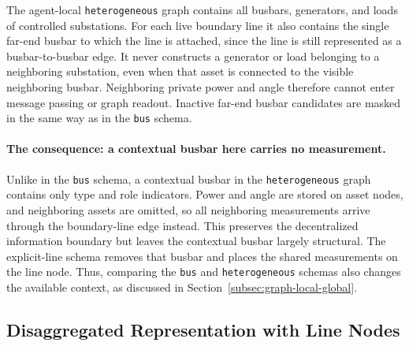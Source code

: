 The agent-local \texttt{heterogeneous} graph contains all busbars, generators,
and loads of controlled substations. For each live boundary line it also
contains the single far-end busbar to which the line is attached, since the
line is still represented as a busbar-to-busbar edge. It never constructs a
generator or load belonging to a neighboring substation, even when that asset
is connected to the visible neighboring busbar. Neighboring private power and
angle therefore cannot enter message passing or graph readout. Inactive
far-end busbar candidates are masked in the same way as in the \texttt{bus}
schema.

{\color{clarif}
\paragraph{The consequence: a contextual busbar here carries no measurement.}
Unlike in the \texttt{bus} schema, a contextual busbar in the
\texttt{heterogeneous} graph contains only type and role indicators. Power and
angle are stored on asset nodes, and neighboring assets are omitted, so all
neighboring measurements arrive through the boundary-line edge instead. This
preserves the decentralized information boundary but leaves the contextual
busbar largely structural. The explicit-line schema removes that busbar and
places the shared measurements on the line node. Thus, comparing the
\texttt{bus} and \texttt{heterogeneous} schemas also changes the available
context, as discussed in Section~\ref{subsec:graph-local-global}.
}





\subsection{Disaggregated Representation with Line Nodes}
\label{sec:heterogeneous-line-graph}

